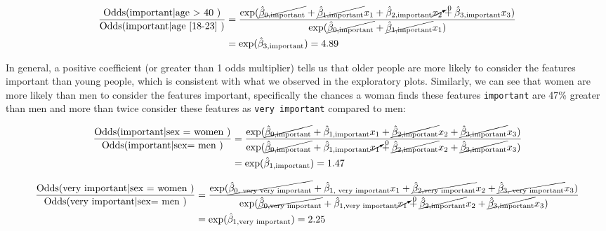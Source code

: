 \documentclass[
  letterpaper,
  DIV=11,
  numbers=noendperiod]{scrartcl}
\begin{document}
\[
\begin{aligned}
\dfrac{\text{Odds}(\text{important|age > 40 })}{\text{Odds}(\text{important|age [18-23] })} &= \dfrac{\exp(\cancel{\hat{\beta}_{\text{0,important}}} + \cancel{\hat{\beta}_{\text{1,important}}} x_1 + \hat{\beta}_{\text{2,important}} \cancelto{0}{x_2}+ \hat{\beta}_{3,\text{important}} x_3 )}{\exp(\cancel{\hat{\beta}_{\text{0,important}}} + \cancel{\hat{\beta}_{\text{1,important}}} x_1)}\\
&= \exp(\hat{\beta}_{3,\text{important}} ) = 4.89
\end{aligned}
\]

In general, a positive coefficient (or greater than 1 odds multiplier)
tells us that older people are more likely to consider the features
important than young people, which is consistent with what we observed
in the exploratory plots. Similarly, we can see that women are more
likely than men to consider the features important, specifically the
chances a woman finds these features \texttt{important} are 47\% greater
than men and more than twice consider these features as
\texttt{very\ important} compared to men:

\[
\begin{aligned} \dfrac{\text{Odds}(\text{important|sex = women })}{\text{Odds}(\text{important|sex= men })} &= \dfrac{\exp(\cancel{\hat{\beta}_{\text{0,important}}} + \hat{\beta}_{\text{1,important}} x_1 + \cancel{\hat{\beta}_{\text{2,important}}} x_2+ \cancel{\hat{\beta}_{3,\text{important}}} x_3 )}{\exp(\cancel{\hat{\beta}_{\text{0,important}}} + \hat{\beta}_{\text{1,important}} \cancelto{0}{x_1} + \cancel{\hat{\beta}_{\text{2,important}}} x_2 + \cancel{\hat{\beta}_{3,\text{important}}} x_3)}\\
&= \exp(\hat{\beta}_{1,\text{important}}) = 1.47 
\end{aligned}
\]

\[ 
\begin{aligned} 
\dfrac{\text{Odds}(\text{very important|sex = women })}{\text{Odds}(\text{very important|sex= men })} &= \dfrac{\exp(\cancel{\hat{\beta}_{\text{0, very very important}}} + \hat{\beta}_{\text{1, very important}} x_1 + \cancel{\hat{\beta}_{\text{2,very important}}} x_2+ \cancel{\hat{\beta}_{3,\text{ very important}}} x_3 )}{\exp(\cancel{\hat{\beta}_{\text{0,very important}}} + \hat{\beta}_{\text{1,very important}} \cancelto{0}{x_1} + \cancel{\hat{\beta}_{\text{2,important}}} x_2 + \cancel{\hat{\beta}_{3,\text{important}}} x_3)}\\
&= \exp(\hat{\beta}_{1,\text{very important}}) = 2.25 
\end{aligned} 
\]
\end{document}
